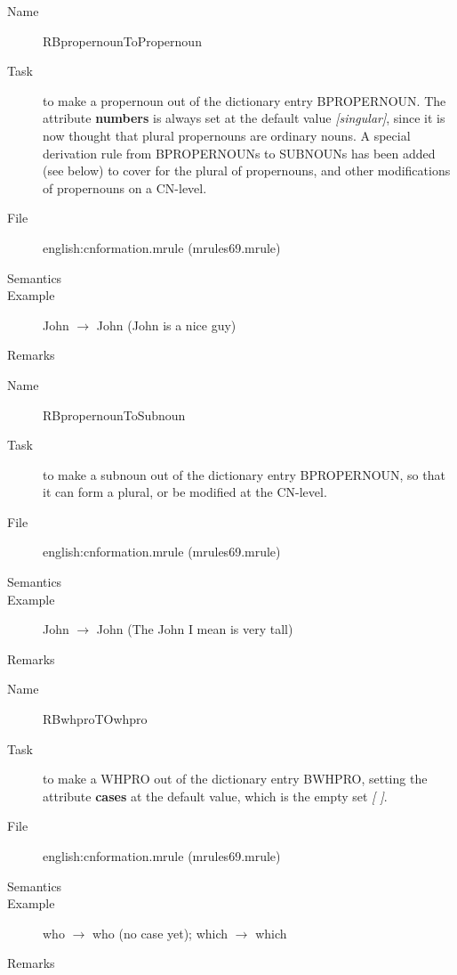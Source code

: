 \vspace{1 cm}
\begin{description}
\item[Name] RBpropernounToPropernoun
\item[Task] to make a propernoun out of the dictionary entry BPROPERNOUN. The 
attribute {\bf numbers} is always set at the default value 
{\em [singular]\/}, 
since it is now thought that plural propernouns are ordinary nouns. A special 
derivation rule from BPROPERNOUNs to SUBNOUNs has been added (see below) 
to cover for 
the plural of propernouns, and other modifications of propernouns on a 
CN-level.
\item[File] english:cnformation.mrule (mrules69.mrule)
\item[Semantics]
\item[Example] John $\rightarrow$ John (John is a nice guy)
\item[Remarks]
\end{description}

\vspace{1 cm}
\begin{description}
\item[Name] RBpropernounToSubnoun
\item[Task] to make a subnoun out of the dictionary entry BPROPERNOUN, so that 
it can form a plural, or be modified at the CN-level.
\item[File] english:cnformation.mrule (mrules69.mrule)
\item[Semantics]
\item[Example] John $\rightarrow$ John (The John I mean is very tall)
\item[Remarks]
\end{description}

\vspace{1 cm}
\begin{description}
\item[Name] RBwhproTOwhpro
\item[Task] to make a WHPRO out of the dictionary entry BWHPRO, setting the 
attribute {\bf cases} at the default value, which is the empty set {\em [ ]\/}.
\item[File] english:cnformation.mrule (mrules69.mrule)
\item[Semantics]
\item[Example] who $\rightarrow$ who (no case yet); which $\rightarrow$ which
\item[Remarks]
\end{description}

